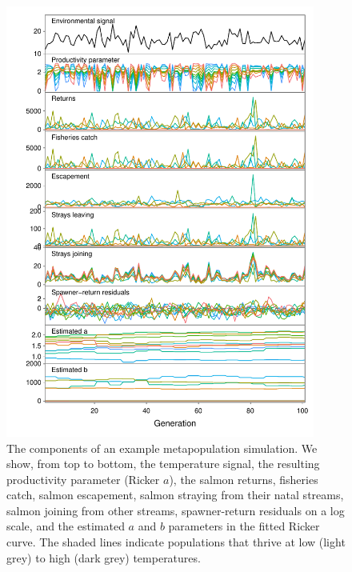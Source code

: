 \begin{figure}[htbp]
\centering
\includegraphics[width=4.0in]{metafolio/Fig3}
\caption[The components of an example metapopulation simulation.]{The components of an example metapopulation simulation. We show, from top to bottom, the temperature signal, the resulting productivity parameter (Ricker $a$), the salmon returns, fisheries catch, salmon escapement, salmon straying from their natal streams, salmon joining from other streams, spawner-return residuals on a log scale, and the estimated $a$ and $b$ parameters in the fitted Ricker curve. The shaded lines indicate populations that thrive at low (light grey) to high (dark grey) temperatures.} \label{f:ts}
\end{figure}

\clearpage

